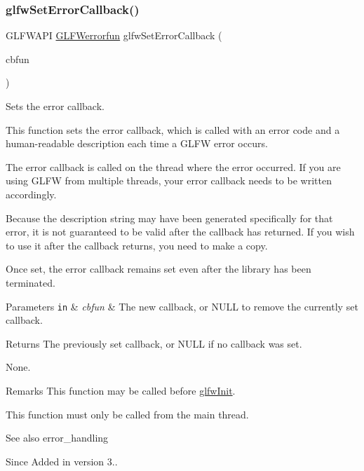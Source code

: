 \subsubsection{\texorpdfstring{glfw\+Set\+Error\+Callback()}{glfwSetErrorCallback()}}
{\footnotesize\ttfamily G\+L\+F\+W\+A\+PI \hyperlink{group__init_ga6b8a2639706d5c409fc1287e8f55e928}{G\+L\+F\+Werrorfun} glfw\+Set\+Error\+Callback (\begin{DoxyParamCaption}\item[{\hyperlink{group__init_ga6b8a2639706d5c409fc1287e8f55e928}{G\+L\+F\+Werrorfun}}]{cbfun }\end{DoxyParamCaption})}



Sets the error callback. 

This function sets the error callback, which is called with an error code and a human-\/readable description each time a G\+L\+FW error occurs.

The error callback is called on the thread where the error occurred. If you are using G\+L\+FW from multiple threads, your error callback needs to be written accordingly.

Because the description string may have been generated specifically for that error, it is not guaranteed to be valid after the callback has returned. If you wish to use it after the callback returns, you need to make a copy.

Once set, the error callback remains set even after the library has been terminated.


\begin{DoxyParams}[1]{Parameters}
\mbox{\tt in}  & {\em cbfun} & The new callback, or {\ttfamily N\+U\+LL} to remove the currently set callback. \\
\hline
\end{DoxyParams}
\begin{DoxyReturn}{Returns}
The previously set callback, or {\ttfamily N\+U\+LL} if no callback was set.
\end{DoxyReturn}
None.

\begin{DoxyRemark}{Remarks}
This function may be called before \hyperlink{group__init_gab41771f0215a2e0afb4cf1cf98082d40}{glfw\+Init}.
\end{DoxyRemark}
This function must only be called from the main thread.

\begin{DoxySeeAlso}{See also}
error\+\_\+handling
\end{DoxySeeAlso}
\begin{DoxySince}{Since}
Added in version 3.. 
\end{DoxySince}
\mbox{\label{group__init_gafd90e6fd4819ea9e22e5e739519a6504}} 
